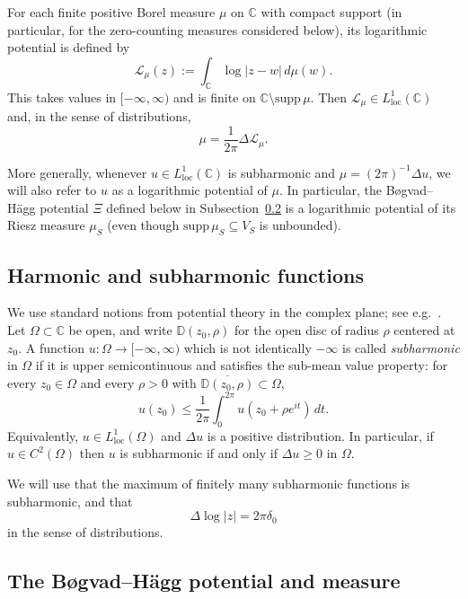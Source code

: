 \documentclass[12pt]{article}
\theoremstyle{plain}
\theoremstyle{definition}
\begin{document}
For each finite positive Borel measure $\mu$ on $\mathbb{C}$ with compact support (in particular, for the zero-counting measures considered below), its logarithmic potential is defined by
\begin{equation}\label{tpm2}
\mathcal L_{\mu}(z):=\int_{\mathbb{C}} \log|z-w|\,d\mu(w).
\end{equation}
This takes values in $[-\infty,\infty)$ and is finite on $\mathbb C\setminus \mathrm{supp}\,\mu$.
Then $\mathcal L_{\mu}\in L^1_{\mathrm{loc}}(\mathbb C)$ and, in the sense of distributions,
\begin{equation}\label{tpm4}
\mu=\frac{1}{2\pi}\Delta \mathcal L_{\mu}.
\end{equation}

More generally, whenever $u\in L^1_{\mathrm{loc}}(\mathbb C)$ is subharmonic and $\mu=(2\pi)^{-1}\Delta u$, we will also refer to $u$ as a logarithmic potential of $\mu$. In particular, the B\o gvad--H\"agg potential $\Xi$ defined below in Subsection~\ref{sub:sec2_BH} is a logarithmic potential of its Riesz measure $\mu_S$ (even though $\mathrm{supp}\,\mu_S\subseteq V_S$ is unbounded).

\subsection{Harmonic and subharmonic functions}\label{sub:sec2_harm}

We use standard notions from potential theory in the complex plane; see e.g.\ \cite{S.E.SR}.
Let $\Omega\subset\mathbb C$ be open, and write $\mathbb{D}(z_0,\rho)$ for the open disc of radius $\rho$ centered at $z_0$.
A function $u:\Omega\to[-\infty,\infty)$ which is not identically $-\infty$ is called \emph{subharmonic} in $\Omega$
if it is upper semicontinuous and satisfies the sub-mean value property:
for every $z_0\in\Omega$ and every $\rho>0$ with $\overline{\mathbb{D}(z_0,\rho)}\subset \Omega$,
$$u(z_0)\le \frac{1}{2\pi}\int_{0}^{2\pi} u(z_0+\rho e^{it})\,dt.$$
Equivalently, $u\in L^1_{\mathrm{loc}}(\Omega)$ and $\Delta u$ is a positive distribution.
In particular, if $u\in C^2(\Omega)$ then $u$ is subharmonic if and only if $\Delta u\ge0$ in $\Omega$.

We will use that the maximum of finitely many subharmonic functions is subharmonic, and that
$$\Delta\log|z|=2\pi\delta_0$$
in the sense of distributions.

\subsection{The B\o gvad--H\"agg potential and measure}\label{sub:sec2_BH}
\end{document}
